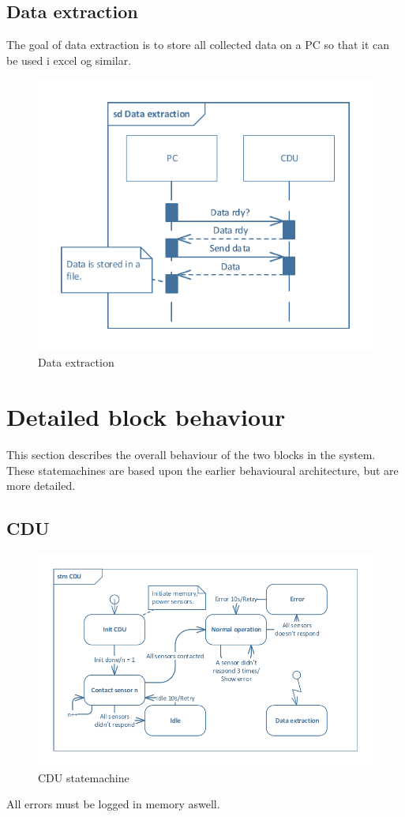 \subsection{Data extraction}
The goal of data extraction is to store all collected data on a PC so that it can be used i excel og similar.

\begin{figure}[hbpt]
\centering
\includegraphics[width=.6\textwidth]{billeder/data_extraction_sd}
\caption{Data extraction}
\end{figure}

\newpage

\section{Detailed block behaviour}
This section describes the overall behaviour of the two blocks in the system.\\
These statemachines are based upon the earlier behavioural architecture, but are more detailed.

\subsection{CDU}

\begin{figure}[hbpt]
\centering
\includegraphics[width=.8\textwidth]{billeder/CDU_STM}
\caption{CDU statemachine}
\end{figure}
All errors must be logged in memory aswell.

